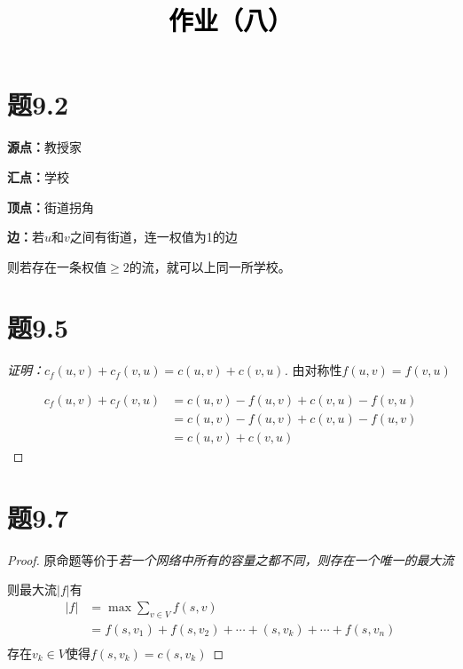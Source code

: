 \documentclass[a4paper,twoside]{article}
\newcommand{\PaperTitle}{作业（八）}  %
\begin{document}
\newpage

\title{
	\Large{\textcolor{black}{\PaperTitle}}
}
	
	
\maketitle
	
\tableofcontents
 
\newpage
\setcounter{page}{1}

\begin{spacing}{1.2}

\section{题9.2}

\textbf{源点：}教授家 

\textbf{汇点：}学校 

\textbf{顶点：}街道拐角

\textbf{边：}若$u$和$v$之间有街道，连一权值为1的边

则若存在一条权值$\ge 2$的流，就可以上同一所学校。

\section{题9.5}

\begin{proof}[证明：$c_f(u,v)+c_f(v,u)=c(u,v)+c(v,u)$]

由对称性$f(u,v)=f(v,u)$

\begin{equation*}
	\begin{aligned}
		c_f(u,v)+c_f(v,u)&=c(u,v)-f(u,v)+c(v,u)-f(v,u)\\
		&=c(u,v)-f(u,v)+c(v,u)-f(u,v)\\
		&=c(u,v)+c(v,u)
	\end{aligned}
\end{equation*}

\end{proof}

\section{题9.7}

\begin{proof}
	原命题等价于\emph{若一个网络中所有的容量之都不同，则存在一个唯一的最大流}

	则最大流$|f|$有
	\begin{equation*}
		\begin{aligned}
			|f|&=\mathop{\max}\sum_{v\in V}f(s,v)\\
			&=f(s,v_1)+f(s,v_2)+\cdots+(s,v_k)+\cdots+f(s,v_n)\\
		\end{aligned}
	\end{equation*}
	存在$v_k\in V$使得$f(s,v_k)=c(s,v_k)$


\end{proof}
\end{spacing}
\end{document}
